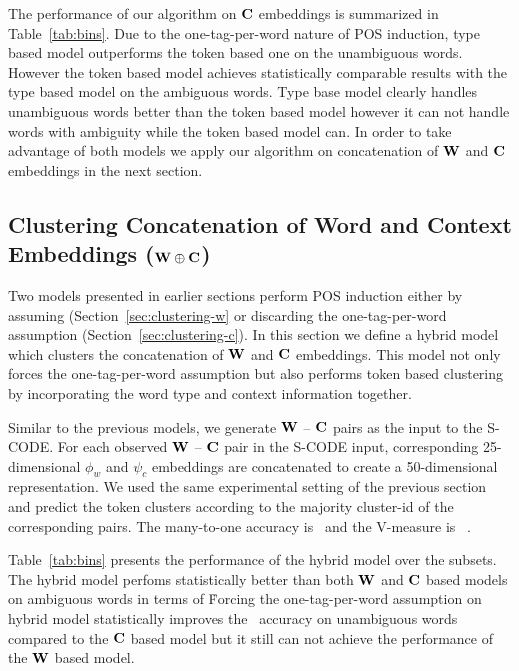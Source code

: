The performance of our algorithm on ${\bf C}$ embeddings is summarized in
Table~\ref{tab:bins}.  Due to the one-tag-per-word nature of POS
induction, type based model outperforms the token based one on the
unambiguous words.  However the token based model achieves
statistically comparable results with the type based model on the
ambiguous words.  Type base model clearly handles unambiguous words
better than the token based model however it can not handle words with
ambiguity while the token based model can.  In order to take advantage
of both models we apply our algorithm on concatenation of ${\bf W}$ and ${\bf C}$
embeddings in the next section.

\subsection{Clustering Concatenation of Word and Context Embeddings (${\bf W}\oplus{\bf C}$)}
\label{sec:clustering-concatenation}

Two models presented in earlier sections perform POS induction either
by assuming (Section~\ref{sec:clustering-w} or discarding the
one-tag-per-word assumption (Section~\ref{sec:clustering-c}).  In this
section we define a hybrid model which clusters the concatenation of
${\bf W}$ and ${\bf C}$ embeddings.  This model not only forces the
one-tag-per-word assumption but also performs token based clustering
by incorporating the word type and context information together.

Similar to the previous models, we generate ${\bf W}$ -- ${\bf C}$
pairs as the input to the S-CODE.  For each observed ${\bf W}$ --
${\bf C}$ pair in the S-CODE input, corresponding 25-dimensional
$\phi_w$ and $\psi_c$ embeddings are concatenated to create a
50-dimensional representation.  We used the same experimental setting
of the previous section and predict the token clusters according to
the majority cluster-id of the corresponding pairs.  The many-to-one
accuracy is \wsxymto\ and the V-measure is \wsxyvm\ .

Table~\ref{tab:bins} presents the performance of the hybrid model over
the subsets.  The hybrid model perfoms statistically better than both
${\bf W}$ and ${\bf C}$ based models on ambiguous words in terms of
\mto\.  Forcing the one-tag-per-word assumption on hybrid model
statistically improves the \mto\ accuracy on unambiguous words
compared to the ${\bf C}$ based model but it still can not achieve the
performance of the ${\bf W}$ based model.



